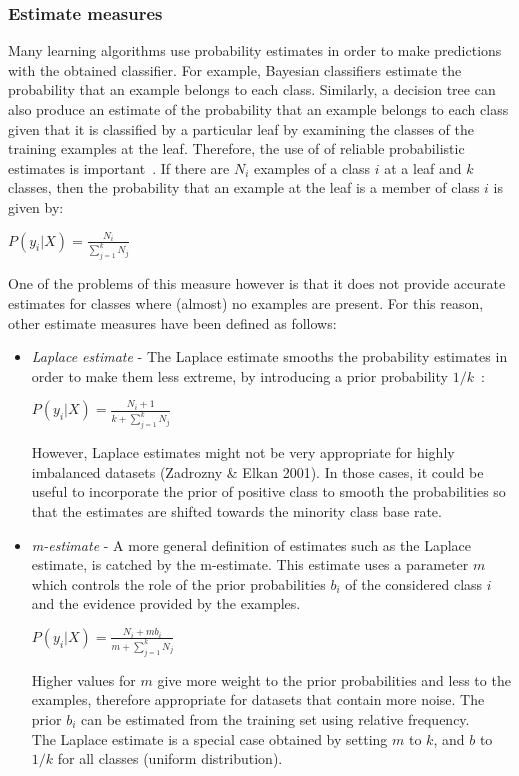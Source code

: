 \subsubsection{Estimate measures} 
Many learning algorithms use probability estimates in order to make predictions with the obtained classifier. For example, Bayesian classifiers estimate the probability that an example belongs to each class. Similarly, a decision tree can also produce an estimate of the probability that an example belongs to each class given that it is classified by a particular leaf by examining the classes of the training examples at the leaf. Therefore, the use of of reliable probabilistic estimates is important~\cite{probability_estimates}. If there are \(N_i\) examples of a class \(i\) at a leaf and \(k\) classes, then the probability that an example at the leaf is a member of class \(i\) is given by:
\begin{center}\(P(y_i|X) = \frac{N_i}{\sum_{j=1}^k{N_j}}\)\end{center}
One of the problems of this measure however is that it does not provide accurate estimates for classes where (almost) no examples are present. For this reason, other estimate measures have been defined as follows:
\newpage
\begin{itemize}
\item \textit{Laplace estimate} - The Laplace estimate smooths the probability estimates in order to make them less extreme, by introducing a prior probability \(1/k\)~\cite{probability_estimates}:
\begin{center}\(P(y_i|X) = \frac{N_{i}+1}{k + \sum_{j=1}^k{N_j}}\)\end{center}
However, Laplace estimates might not be very appropriate for highly imbalanced datasets (Zadrozny \& Elkan 2001).  In those cases, it could be useful to incorporate the prior of positive class to smooth the probabilities so that the estimates are shifted towards the minority class base rate.  
\item \textit{m-estimate} - A more general definition of estimates such as the Laplace estimate, is catched by the m-estimate. This estimate uses a parameter \(m\) which controls the role of the prior probabilities \(b_i\) of the considered class \(i\) and the evidence provided by the examples.
\begin{center}\(P(y_i|X) = \frac{N_{i}+mb_i}{m + \sum_{j=1}^k{N_j}}\)\end{center}
Higher values for \(m\) give more weight to the prior probabilities and less to the examples, therefore appropriate for datasets that contain more noise. The prior \(b_i\) can be estimated from the training set using relative frequency.\\
The Laplace estimate is a special case obtained by setting \(m\) to \(k\), and \(b\) to \(1/k\) for all classes (uniform distribution).

\end{itemize}




